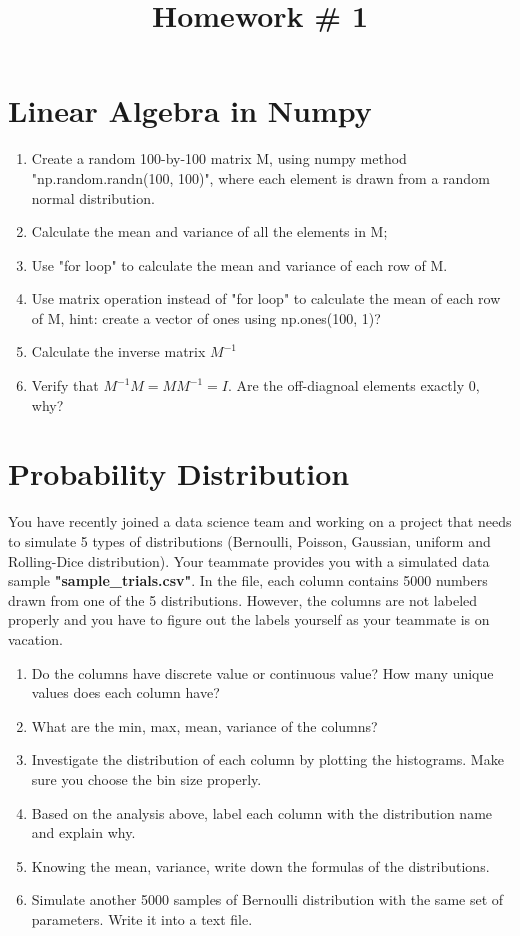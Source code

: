 \documentclass{article}
\title{Homework \# 1} %
\begin{document}
\maketitle %
\thispagestyle{fancy}
\pagestyle{fancy}

\section{Linear Algebra in Numpy}

\begin{enumerate}[(1)]
\item Create a random 100-by-100 matrix M, using numpy method "np.random.randn(100, 100)", where each element is drawn from a random normal distribution.
\item Calculate the mean and variance of all the elements in M; 
\item Use "for loop" to calculate the mean and variance of each row of M.
\item Use matrix operation instead of "for loop" to calculate the mean of each row of M, hint: create a vector of ones using np.ones(100, 1)?  
\item Calculate the inverse matrix $M^{-1}$
\item Verify that $M^{-1}M = MM^{-1}= I$. Are the off-diagnoal elements exactly 0, why?

\end{enumerate}


\section{Probability Distribution}
You have recently joined a data science team and working on a project that needs to simulate 5 types of distributions (Bernoulli, Poisson, Gaussian, uniform and Rolling-Dice distribution). Your teammate provides you with a simulated data sample \textbf{"sample\_trials.csv"}. In the file, each column contains 5000 numbers drawn from one of the 5 distributions. However, the columns are not labeled properly and you have to figure out the labels yourself as your teammate is on vacation.

\begin{enumerate}[(1)]
\item Do the columns have discrete value or continuous value? How many unique values does each column have? 
\item What are the min, max, mean, variance of the columns?
\item Investigate the distribution of each column by plotting the histograms. Make sure you choose the bin size properly.
\item Based on the analysis above, label each column with the distribution name and explain why. 
\item Knowing the mean, variance, write down the formulas of the distributions.
\item Simulate another 5000 samples of Bernoulli distribution with the same set of parameters. Write it into a text file.
\end{enumerate}
\end{document}
